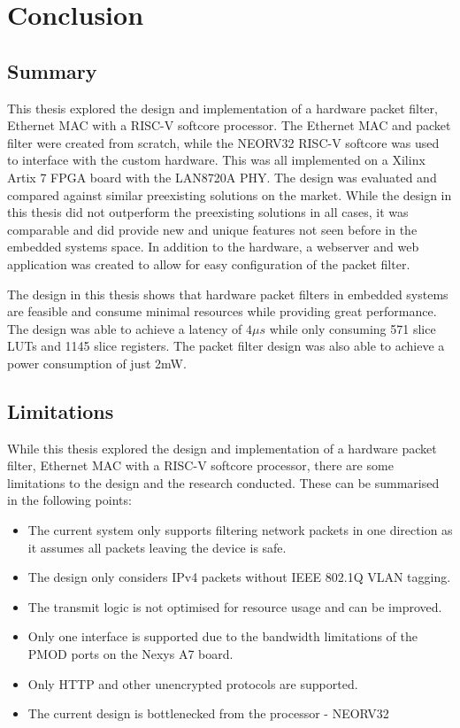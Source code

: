 \chapter[Conclusion]{Conclusion}
\label{Chap:Conclusion}

\section{Summary}

This thesis explored the design and implementation of a hardware packet filter, Ethernet MAC with a RISC-V softcore processor. The Ethernet MAC and packet filter were created from scratch, while the NEORV32 RISC-V softcore was used to interface with the custom hardware. This was all implemented on a Xilinx Artix 7 FPGA board with the LAN8720A PHY. The design was evaluated and compared against similar preexisting solutions on the market. While the design in this thesis did not outperform the preexisting solutions in all cases, it was comparable and did provide new and unique features not seen before in the embedded systems space. In addition to the hardware, a webserver and web application was created to allow for easy configuration of the packet filter. 

The design in this thesis shows that hardware packet filters in embedded systems are feasible and consume minimal resources while providing great performance. The design was able to achieve a latency of $4\mu s$ while only consuming 571 slice LUTs and 1145 slice registers. The packet filter design was also able to achieve a power consumption of just 2mW.



\section{Limitations}
While this thesis explored the design and implementation of a hardware packet filter, Ethernet MAC with a RISC-V softcore processor, there are some limitations to the design and the research conducted. These can be summarised in the following points:


\begin{itemize}
    \item The current system only supports filtering network packets in one direction as it assumes all packets leaving the device is safe. 
    \item The design only considers IPv4 packets without IEEE 802.1Q VLAN tagging.
    \item The transmit logic is not optimised for resource usage and can be improved.
    \item Only one interface is supported due to the bandwidth limitations of the PMOD ports on the Nexys A7 board.
    \item Only HTTP and other unencrypted protocols are supported.
    \item The current design is bottlenecked from the processor - NEORV32
\end{itemize}


